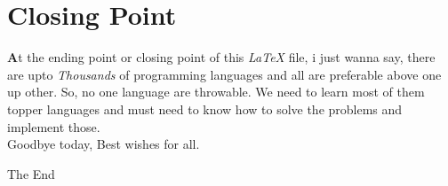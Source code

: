 \documentclass[paper = A5, headinclude, parskip = full, oneside, font = 11 pt]{report}
\begin{document}
\begin{center}

 \begin{figure}

 \begin{tcolorbox}[colframe = yellow, colback = green!89]

 
 \end{tcolorbox}
 
 \end{figure}

\end{center}

\chapter{Closing Point}

\textbf{A}t the ending point or closing point of this \emph{\LaTeX{}} file, i just wanna say, there are upto \emph{Thousands} of programming languages and all are preferable above one up other. So, no one language are throwable. We need to learn most of them topper languages and must need to know how to solve the problems and implement those.
\\
Goodbye today, Best wishes for all.

\begin{tcolorbox}[colback = blue!35, colframe = black]
 \centering
 The End
\end{tcolorbox}
\end{document}
